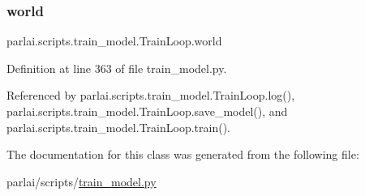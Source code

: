 \mbox{\label{classparlai_1_1scripts_1_1train__model_1_1TrainLoop_aa22c430edd5956591bd0d266f0984ebb}} 
\subsubsection{\texorpdfstring{world}{world}}
{\footnotesize\ttfamily parlai.\+scripts.\+train\+\_\+model.\+Train\+Loop.\+world}



Definition at line 363 of file train\+\_\+model.\+py.



Referenced by parlai.\+scripts.\+train\+\_\+model.\+Train\+Loop.\+log(), parlai.\+scripts.\+train\+\_\+model.\+Train\+Loop.\+save\+\_\+model(), and parlai.\+scripts.\+train\+\_\+model.\+Train\+Loop.\+train().



The documentation for this class was generated from the following file\+:\begin{DoxyCompactItemize}
\item 
parlai/scripts/\hyperlink{parlai_2scripts_2train__model_8py}{train\+\_\+model.\+py}\end{DoxyCompactItemize}
